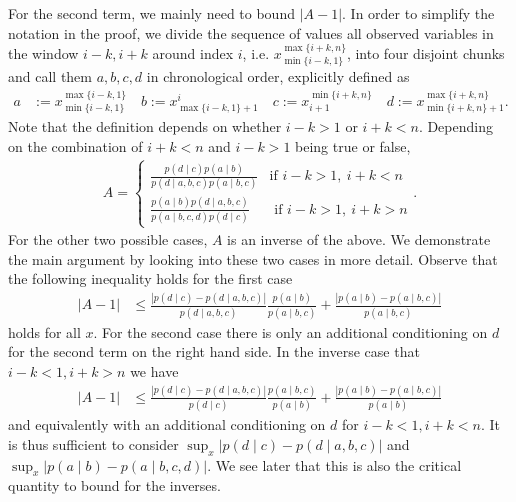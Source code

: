 \documentclass[twoside,11pt]{article}
\newcommand{\numobs}{\ensuremath{n}}
\begin{document}
For the second term, we mainly need to bound $|A-1|$. In order to
simplify the notation in the proof, we divide the sequence of values
all observed variables in the window $i-k, i+k$ around index $i$, i.e.
$x_{\min\{i-k,1\}}^{\max\{i+k, \numobs\}}$, into four disjoint chunks
and call them $a, b, c, d$ in chronological order, explicitly defined
as
\begin{align*}
a &:= x_{\min\{i-k,1\}}^{\max\{i-k,1\}}  \quad b:= x_{\max\{i-k,1\}+1}^i
\quad c := x_{i+1}^{\min\{i+k,n\}} \quad d:= x_{\min\{i+k,n\}+1}^{\max\{i+k,n\}}.
\end{align*}
Note that the definition depends on whether $i-k > 1$ or $i+k < n$.
Depending on the combination of $i+k < n$ and $i-k > 1$ being true
or false,
\begin{align*}
A = 
\begin{cases} \frac{p(d \mid c) p(a \mid b)}{p(d \mid a,b,c) p(a \mid b,c)} 
  & \text{if } i-k >1, \:i+k < n\\
\frac{p(a\mid b) p(d \mid a,b,c)}{p(a \mid b,c, d) p(d \mid c)} 
& \text{ if } i-k > 1, \: i+ k >n
\end{cases}.
\end{align*}
For the other two possible cases, $A$ is an inverse of the above.
We demonstrate the main argument by looking into these two cases in more detail.
Observe that the following inequality holds for the first case
\begin{align*}
|A - 1 | &\leq \frac{|p(d\mid c) - p(d\mid a,b,c)|}{p(d \mid a,b,c)} 
\frac{p(a \mid b)}{p(a \mid b,c)} + \frac{|p(a \mid b) - p(a \mid b,c)|}{p(a\mid b,c)} 
\end{align*}
holds for all $x$. For the second case there is only an additional
conditioning on $d$ for the second term on the right hand side.
In the inverse case that $i-k< 1, i+k > n$ we have
\begin{align*}
|A - 1 | &\leq \frac{|p(d\mid c) - p(d\mid a,b,c)|}{p(d \mid c)} 
\frac{p(a \mid b, c)}{p(a \mid b)} + \frac{|p(a \mid b) - p(a \mid b,c)|}{p(a\mid b)} 
\end{align*}
and equivalently with an additional conditioning on $d$ for $i-k <1, i+k < n$.
It is thus sufficient to consider $\sup_x |p(d\mid c) - p(d \mid
a,b,c)|$ and $\sup_x |p(a\mid b) - p(a \mid b,c,d)|$. We see later
that this is also the critical quantity to bound for the inverses. 
\end{document}
